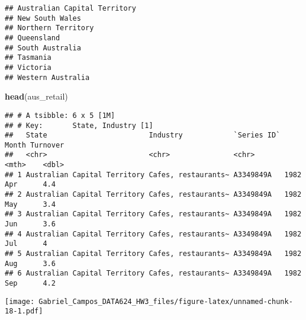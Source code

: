 \documentclass[
]{article}
\newenvironment{Shaded}{\begin{snugshade}}{\end{snugshade}}
\newcommand{\AttributeTok}[1]{\textcolor[rgb]{0.13,0.29,0.53}{#1}}
\newcommand{\FunctionTok}[1]{\textcolor[rgb]{0.13,0.29,0.53}{\textbf{#1}}}
\newcommand{\NormalTok}[1]{#1}
\newcommand{\SpecialCharTok}[1]{\textcolor[rgb]{0.81,0.36,0.00}{\textbf{#1}}}
\newcommand{\StringTok}[1]{\textcolor[rgb]{0.31,0.60,0.02}{#1}}
\begin{document}
\begin{verbatim}
## Australian Capital Territory
## New South Wales
## Northern Territory
## Queensland
## South Australia
## Tasmania
## Victoria
## Western Australia
\end{verbatim}

\begin{Shaded}
\begin{Highlighting}[]
\FunctionTok{head}\NormalTok{(aus\_retail)}
\end{Highlighting}
\end{Shaded}

\begin{verbatim}
## # A tsibble: 6 x 5 [1M]
## # Key:       State, Industry [1]
##   State                        Industry            `Series ID`    Month Turnover
##   <chr>                        <chr>               <chr>          <mth>    <dbl>
## 1 Australian Capital Territory Cafes, restaurants~ A3349849A   1982 Apr      4.4
## 2 Australian Capital Territory Cafes, restaurants~ A3349849A   1982 May      3.4
## 3 Australian Capital Territory Cafes, restaurants~ A3349849A   1982 Jun      3.6
## 4 Australian Capital Territory Cafes, restaurants~ A3349849A   1982 Jul      4  
## 5 Australian Capital Territory Cafes, restaurants~ A3349849A   1982 Aug      3.6
## 6 Australian Capital Territory Cafes, restaurants~ A3349849A   1982 Sep      4.2
\end{verbatim}

\begin{Shaded}
\end{Shaded}

\texttt{[image: Gabriel\_Campos\_DATA624\_HW3\_files/figure-latex/unnamed-chunk-18-1.pdf]}
\end{document}
